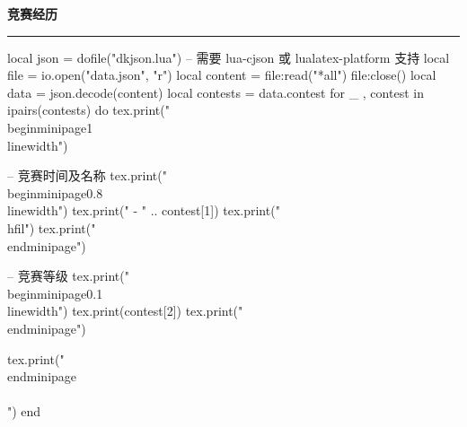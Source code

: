 \documentclass[10pt, a4paper, oneside]{ctexart}
\begin{document}
\ifdefined\contest
\begin{minipage}{1\textwidth}
    \large{\ifdefined\showIcon \makebox[\iconAlignWide][c]{\faTrophy} \fi \textbf{竞赛经历}}
\end{minipage}
\rule{\linewidth}{\lineSize}
\begin{center}
    \begin{minipage}{0.9\textwidth}
        \begin{luacode}
            local json = dofile("dkjson.lua")  -- 需要 lua-cjson 或 lualatex-platform 支持
            local file = io.open("data.json", "r")
            local content = file:read("*all")
            file:close()
            local data = json.decode(content)
            local contests = data.contest
            for _ , contest in ipairs(contests) do
                tex.print("\\begin{minipage}{1\\linewidth}")

                -- 竞赛时间及名称
                tex.print("\\begin{minipage}{0.8\\linewidth}")
                tex.print(" - " .. contest[1])
                tex.print("\\hfil")
                tex.print("\\end{minipage}")

                -- 竞赛等级
                tex.print("\\begin{minipage}{0.1\\linewidth}")
                tex.print(contest[2])
                tex.print("\\end{minipage}")

                tex.print("\\end{minipage}\\\\[0.5em]")
            end
        \end{luacode}
    \end{minipage}
\end{center}
\fi
\end{document}
